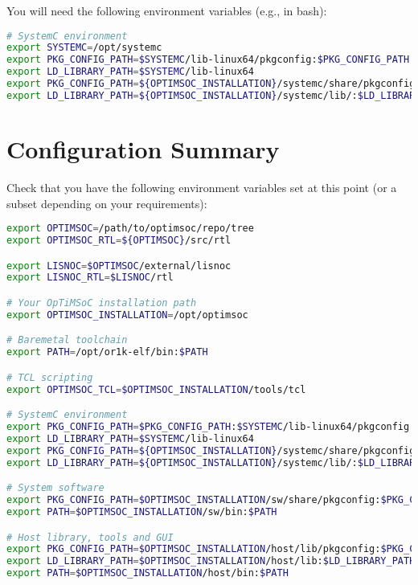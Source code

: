 You will need the following environment variables (e.g., in bash):

\begin{lstlisting}[language=bash]
# SystemC environment
export SYSTEMC=/opt/systemc
export PKG_CONFIG_PATH=$SYSTEMC/lib-linux64/pkgconfig:$PKG_CONFIG_PATH
export LD_LIBRARY_PATH=$SYSTEMC/lib-linux64
export PKG_CONFIG_PATH=${OPTIMSOC_INSTALLATION}/systemc/share/pkgconfig:$PKG_CONFIG_PATH
export LD_LIBRARY_PATH=${OPTIMSOC_INSTALLATION}/systemc/lib/:$LD_LIBRARY_PATH
\end{lstlisting}

\section{Configuration Summary}

Check that you have the following environment variables set at this
point (or a subset depending on your requirements):

\begin{lstlisting}[language=bash]
export OPTIMSOC=/path/to/optimsoc/repo/tree
export OPTIMSOC_RTL=${OPTIMSOC}/src/rtl

export LISNOC=$OPTIMSOC/external/lisnoc
export LISNOC_RTL=$LISNOC/rtl

# Your OpTiMSoC installation path
export OPTIMSOC_INSTALLATION=/opt/optimsoc

# Baremetal toolchain
export PATH=/opt/or1k-elf/bin:$PATH

# TCL scripting
export OPTIMSOC_TCL=$OPTIMSOC_INSTALLATION/tools/tcl

# SystemC environment
export PKG_CONFIG_PATH=$PKG_CONFIG_PATH:$SYSTEMC/lib-linux64/pkgconfig
export LD_LIBRARY_PATH=$SYSTEMC/lib-linux64
export PKG_CONFIG_PATH=${OPTIMSOC_INSTALLATION}/systemc/share/pkgconfig:$PKG_CONFIG_PATH
export LD_LIBRARY_PATH=${OPTIMSOC_INSTALLATION}/systemc/lib/:$LD_LIBRARY_PATH

# System software
export PKG_CONFIG_PATH=$OPTIMSOC_INSTALLATION/sw/share/pkgconfig:$PKG_CONFIG_PATH
export PATH=$OPTIMSOC_INSTALLATION/sw/bin:$PATH

# Host library, tools and GUI
export PKG_CONFIG_PATH=$OPTIMSOC_INSTALLATION/host/lib/pkgconfig:$PKG_CONFIG_PATH
export LD_LIBRARY_PATH=$OPTIMSOC_INSTALLATION/host/lib:$LD_LIBRARY_PATH
export PATH=$OPTIMSOC_INSTALLATION/host/bin:$PATH
\end{lstlisting}

